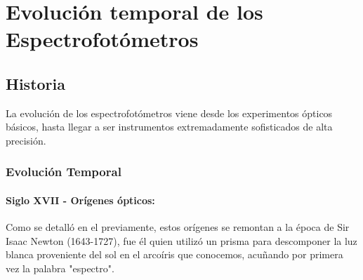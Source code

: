 
\chapter{Evolución temporal de los Espectrofotómetros}

\section{Historia}
La evolución de los espectrofotómetros viene desde los experimentos ópticos básicos, hasta llegar a ser instrumentos extremadamente sofisticados de alta precisión. 

\subsection{Evolución Temporal}


\subsubsection{Siglo XVII - Orígenes ópticos:} Como se detalló en el \cite{} previamente, estos orígenes se remontan a la época de Sir Isaac Newton (1643-1727), fue él quien utilizó un prisma para descomponer la luz blanca proveniente del sol en el arcoíris que conocemos, acuñando por primera vez la palabra "espectro".
